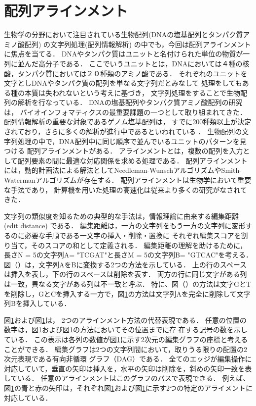 \section{配列アラインメント}
生物学の分野において注目されている生物配列(DNAの塩基配列とタンパク質アミノ酸配列) の文字列処理(配列情報解析)
\cite{浅井潔2000配列情報と確立モデル,後藤修1998マルチプルアラインメントは生体高分子情報の交差点}
の中でも，今回は配列アラインメントに焦点を当てる．
DNAやタンパク質はユニットと名付けられた単位の物質が一列に並んだ高分子である．
ここでいうユニットとは，DNAにおいては４種の核酸，タンパク質においては２０種類のアミノ酸である．
それぞれのユニットを文字としDNAやタンパク質の配列を単なる文字列だとみなして
処理をしてもある種の本質は失われないという考えに基づき，
文字列処理をすることで生物配列の解析を行なっている．
DNAの塩基配列やタンパク質アミノ酸配列の研究は，
バイオインフォマティクスの最重要課題の一つとして取り組まれてきた．
配列情報解析の重要な対象であるゲノム塩基配列は，
すでに200種類以上が決定されており，さらに多くの解析が進行中であるといわれている
\cite{浅井潔2005バイオインフォマティクス}．
生物配列の文字列処理の中で，DNA配列中に同じ順序で並んでいるユニットのパターンを見つける
配列アラインメントがある\cite{須戸里織2011バイオインフォマティクスゲノム配列から
機能解析へバイオインフォマティクスゲノム配列から機能解析へ}．
アラインメントとは，複数の配列を入力として配列要素の間に最適な対応関係を求める処理である．
配列アラインメントには，動的計画法による解法としてNeedleman-Wunschアルゴリズム\cite{needleman1970general}やSmith-Watermanアルゴリズム\cite{smith1981identification}が存在する．
配列アラインメントは生物学において重要な手法であり，
計算機を用いた処理の高速化は従来より多くの研究がなされてきた\cite{須戸里織2011gpu,宗川裕馬2008統合開発環境,sandes2011smith,liu2015accelerating,伊野文彦2007gpu}．

文字列の類似度を知るための典型的な手法は，情報理論に由来する編集距離 (edit distance) である．
編集距離は，一方の文字列をもう一方の文字列に変形するのに必要な手順である一文字の挿入・削除・置換に
それぞれ編集スコアを割り当て，そのスコアの和として定義される．
編集距離の理解を助けるために，長さN = 5の文字列A= "TCGAT"と長さM = 5の文字列B= "GTCAC"を考える．
図（）は，文字列AをBに変換する2つの方法を示している．
上の行のスペースは挿入を表し，下の行のスペースは削除を表す．
両方の行に同じ文字がある列は一致，異なる文字がある列は不一致と呼ぶ．
特に、図（）の方法は文字GとTを削除し，GとCを挿入する一方で，図\ref{}の方法は文字列Aを完全に削除して文字列Bを挿入している．

図\ref{}および図\ref{}は， 2つのアラインメント方法の代替表現である．
任意の位置の数字は，図\ref{}および図\ref{}の方法においてその位置までに存
在する記号の数を示している．
この表示は各列の数値が図\ref{}に示す2次元の編集グラフの座標と考えることができる．
編集グラフは2つの文字列間において，取りうる限りの配置の2次元表現である有向非循環
グラフ（DAG）である．
全てのエッジが編集操作に対応していて，垂直の矢印は挿入を，水平の矢印は削除を，斜めの矢印一致を表している．
任意のアラインメントはこのグラフのパスで表現できる．
例えば、図\ref{}の青と赤の矢印は，それぞれ図\ref{}および図\ref{}に示す2つの特定のアライメントに対応している．

